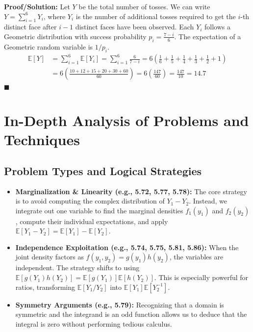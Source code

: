 \documentclass[11pt, a4paper]{article}
\theoremstyle{definition}
\theoremstyle{remark}
\newcommand{\E}{\mathbb{E}}
\begin{document}
\textbf{Proof/Solution:}
Let $Y$ be the total number of tosses. We can write $Y = \sum_{i=1}^6 Y_i$, where $Y_i$ is the number of additional tosses required to get the $i$-th distinct face after $i-1$ distinct faces have been observed.
Each $Y_i$ follows a Geometric distribution with success probability $p_i = \frac{7-i}{6}$.
The expectation of a Geometric random variable is $1/p_i$.
\begin{align*}
    \E[Y] &= \sum_{i=1}^6 \E[Y_i] = \sum_{i=1}^6 \frac{6}{7-i} = 6 \left( \frac{1}{6} + \frac{1}{5} + \frac{1}{4} + \frac{1}{3} + \frac{1}{2} + 1 \right) \\
    &= 6 \left( \frac{10 + 12 + 15 + 20 + 30 + 60}{60} \right) = 6 \left( \frac{147}{60} \right) = \frac{147}{10} = 14.7
\end{align*}
\hfill $\blacksquare$

\newpage
\section{In-Depth Analysis of Problems and Techniques}

\subsection{Problem Types and Logical Strategies}
\begin{itemize}
    \item \textbf{Marginalization \& Linearity (e.g., 5.72, 5.77, 5.78):} The core strategy is to avoid computing the complex distribution of $Y_1 - Y_2$. Instead, we integrate out one variable to find the marginal densities $f_1(y_1)$ and $f_2(y_2)$, compute their individual expectations, and apply $\E[Y_1 - Y_2] = \E[Y_1] - \E[Y_2]$.
    \item \textbf{Independence Exploitation (e.g., 5.74, 5.75, 5.81, 5.86):} When the joint density factors as $f(y_1, y_2) = g(y_1)h(y_2)$, the variables are independent. The strategy shifts to using $\E[g(Y_1)h(Y_2)] = \E[g(Y_1)]\E[h(Y_2)]$. This is especially powerful for ratios, transforming $\E[Y_1/Y_2]$ into $\E[Y_1]\E[Y_2^{-1}]$.
    \item \textbf{Symmetry Arguments (e.g., 5.79):} Recognizing that a domain is symmetric and the integrand is an odd function allows us to deduce that the integral is zero without performing tedious calculus.
\end{itemize}
\end{document}
